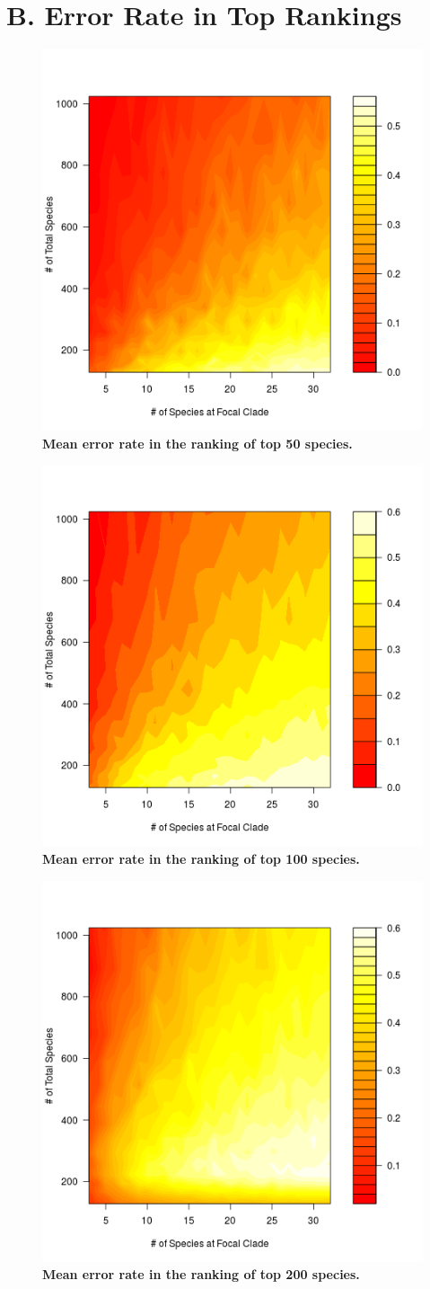 \documentclass[12pt,english]{article}
\begin{document}
\clearpage
\section*{B. Error Rate in Top Rankings}

\begin{figure}[!ht]
  \center
  \includegraphics[width=.5\textwidth]{errorRate50.png}
  \caption{\textbf{Mean error rate in the ranking of top 50 species.}}
\end{figure}

\begin{figure}[!ht]
  \center
  \includegraphics[width=.5\textwidth]{errorRate100.png}
  \caption{\textbf{Mean error rate in the ranking of top 100 species.} }
\end{figure}

\begin{figure}[!ht]
  \center
  \includegraphics[width=.5\textwidth]{errorRate200.png}
  \caption{\textbf{Mean error rate in the ranking of top 200 species.} }
\end{figure}
\end{document}
